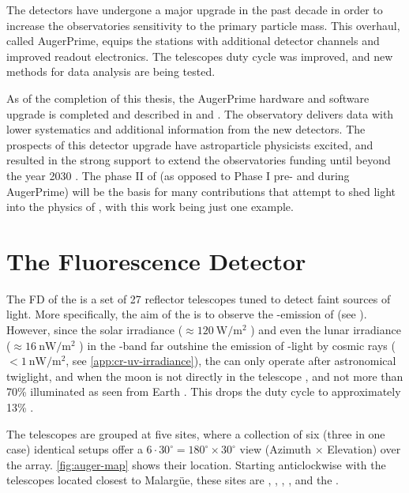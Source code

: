 The detectors have undergone a major upgrade in the past decade in order to 
increase the observatories sensitivity to the primary particle mass. This 
overhaul, called AugerPrime, equips the \SD stations with additional detector 
channels and improved readout electronics. The \FD telescopes duty cycle was 
improved, and new methods for data analysis are being tested.

As of the completion of this thesis, the AugerPrime hardware and software 
upgrade is completed and described in  and 
\cite{collaborationPierreAugerObservatory2011}. The observatory delivers data 
with lower systematics and additional information from the new detectors. The 
prospects of this detector upgrade have astroparticle physicists excited, and 
resulted in the strong support to extend the observatories funding until beyond
the year 2030 \cite{castellinaOutcomeFinanceBoard2023}. The phase II of \DAQ 
(as opposed to Phase I pre- and during AugerPrime) will be the basis for many 
contributions that attempt to shed light into the physics of \UHECRs, with this
work being just one example.

\section{The Fluorescence Detector}
\label{sec:fd}

The \acf{FD} of the \PAO is a set of 27 reflector telescopes tuned to detect 
faint sources of \UV light. More specifically, the aim of the \FD is to observe
the \UV-emission of \EAS (see ). However, since the 
solar irradiance ($\approx\SI{120}{\watt\per\meter\squared}$ 
\cite{leanContributionUltravioletIrradiance1989}) and even the lunar irradiance 
($\approx\SI{16}{\nano\watt\per\meter\squared}$
\cite{snowAbsoluteUltravioletIrradiance2013}) in the \UV-band far outshine the 
emission of \UV-light by cosmic rays ($<\SI{1}{\nano\watt\per\meter\squared}$, 
see \cref{app:cr-uv-irradiance}), the \FD can only operate after astronomical 
twiglight, and when the moon is not directly in the telescope \FOV, and not
more than 70\% illuminated as seen from Earth \cite{mathesCriteriaFDShift}. 
This drops the duty cycle to approximately 13\% 
\cite{abrahamFluorescenceDetectorPierre2010}.

The telescopes are grouped at five \FD sites, where a collection of six (three
in one case) identical setups offer a $6\cdot30^\circ=180^\circ\times30^\circ$ 
view (Azimuth $\times$ Elevation) over the \SD array. \cref{fig:auger-map} 
shows their location. Starting anticlockwise with the telescopes located 
closest to Malargüe, these sites are \LL, \LM, \LA, , and the \HEAT.

